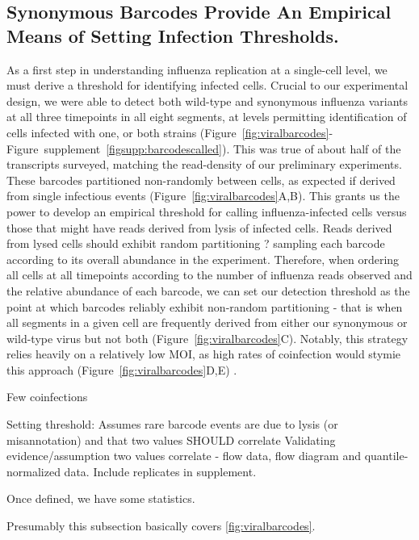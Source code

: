 \documentclass[9pt,lineno]{elife}
\begin{document}
\subsection{Synonymous Barcodes Provide An Empirical Means of Setting Infection Thresholds.}
As a first step in understanding influenza replication at a single-cell level, we must derive a threshold for identifying infected cells. 
Crucial to our experimental design, we were able to detect both wild-type and synonymous influenza variants at all three timepoints in all eight segments, at levels permitting identification of cells infected with one, or both strains (Figure~\ref{fig:viralbarcodes}-Figure~supplement~\ref{figsupp:barcodescalled}). 
This was true of about half of the transcripts surveyed, matching the read-density of our preliminary experiments. 
These barcodes partitioned non-randomly between cells, as expected if derived from single infectious events (Figure~\ref{fig:viralbarcodes}A,B). 
This grants us the power to develop an empirical threshold for calling influenza-infected cells versus those that might have reads derived from lysis of infected cells. 
Reads derived from lysed cells should exhibit random partitioning ? sampling each barcode according to its overall abundance in the experiment. 
Therefore, when ordering all cells at all timepoints according to the number of influenza reads observed and the relative abundance of each barcode, we can set our detection threshold as the point at which barcodes reliably exhibit non-random partitioning - that is when all segments in a given cell are frequently derived from either our synonymous or wild-type virus but not both (Figure~\ref{fig:viralbarcodes}C). 
Notably, this strategy relies heavily on a relatively low MOI, as high rates of coinfection would stymie this approach (Figure~\ref{fig:viralbarcodes}D,E) . 

Few coinfections

Setting threshold: Assumes rare barcode events are due to lysis (or misannotation)  and that two values SHOULD correlate
Validating evidence/assumption two values correlate - flow data, flow diagram and quantile-normalized data. Include replicates in supplement.

Once defined, we have some statistics.

Presumably this subsection basically covers \ref{fig:viralbarcodes}. 
\end{document}
